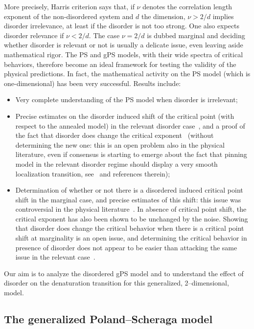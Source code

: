 \documentclass[10pt]{amsart}
\theoremstyle{definition}\newtheorem{defi}[theo]{Definition}\newtheorem{rema}[theo]{Remark}\newtheorem{exam}[theo]{Example}\newtheorem{exem}[theo]{Example}\newtheorem{nota}[theo]{Notation}
\begin{document}
More precisely, Harris criterion says that, if $\nu$ denotes the correlation length exponent of the non-disordered system and $d $ the dimension, $\nu >2/d$ implies disorder irrelevance, at least if the disorder is not too strong. One also expects disorder relevance if $\nu< 2/d$. The case $\nu= 2/d$ is dubbed marginal and deciding whether disorder is relevant or not is usually a delicate issue, even leaving aside mathematical rigor. The PS and gPS models, with their wide spectra of critical behaviors, therefore become an ideal framework for testing the validity of the physical predictions. In fact, the mathematical activity on the PS model (which is one-dimensional) has been very successful. Results include:
\begin{itemize}
\item Very complete understanding of the PS model when disorder is irrelevant\linebreak\cite{cf:A08,cf:G,cf:Lac,cf:Ton08};
\item Precise estimates on the disorder induced shift of the critical point (with respect to the annealed model) in the relevant disorder case~\cite{cf:AZ09,cf:DGLT09}, and a proof of the fact that disorder does change the critical exponent~\cite{cf:CH13,cf:GT06} (without determining the new one: this is an open problem also in the physical literature, even if consensus is starting to emerge about the fact that pinning model in the relevant disorder regime should display a very smooth localization transition, see~\cite{cf:BGL,cf:DR} and references therein);
\item Determination of whether or not there is a disordered induced critical point shift in the marginal case, and precise estimates of this shift: this issue was controversial in the physical literature~\cite{cf:BL16,cf:1GLT10}. In absence of critical point shift, the critical exponent has also been shown to be unchanged by the noise. Showing that disorder does change the critical behavior when there is a critical point shift at marginality is an open issue, and determining the critical behavior in presence of disorder does not appear to be easier than attacking the same issue in the relevant case~\cite{cf:DR}.
\end{itemize}

Our aim is to analyze the disordered gPS model and to understand the effect of disorder on the denaturation transition for this generalized, 2--dimensional, model.

\subsection{The generalized Poland--Scheraga model}\label{sec:model}
\end{document}
